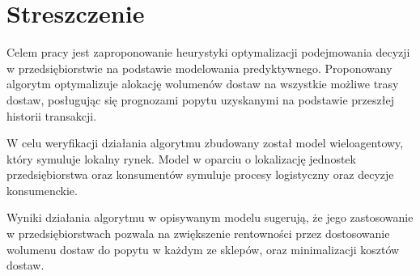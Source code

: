 \documentclass[polish, twoside, 12pt, a4paper]{article}
\theoremstyle{definition}
\theoremstyle{plain}
\theoremstyle{remark}
\begin{document}
\clearpage
{}
\section*{Streszczenie}


Celem pracy jest zaproponowanie heurystyki optymalizacji podejmowania decyzji w przedsiębiorstwie na podstawie modelowania predyktywnego. Proponowany algorytm optymalizuje alokację wolumenów dostaw na wszystkie możliwe trasy dostaw, posługując się prognozami popytu uzyskanymi na podstawie przeszłej historii transakcji. 

W celu weryfikacji działania algorytmu zbudowany został model wieloagentowy, który symuluje lokalny rynek. Model w oparciu o lokalizację jednostek przedsiębiorstwa oraz konsumentów symuluje procesy logistyczny oraz decyzje konsumenckie. 

Wyniki działania algorytmu w opisywanym modelu sugerują, że jego zastosowanie w przedsiębiorstwach pozwala na zwiększenie rentowności przez dostosowanie wolumenu dostaw do popytu w każdym ze sklepów, oraz minimalizacji kosztów dostaw.
\end{document}
